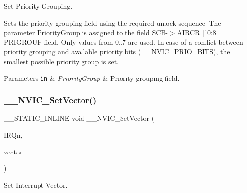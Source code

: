 Set Priority Grouping. 

Sets the priority grouping field using the required unlock sequence. The parameter Priority\+Group is assigned to the field S\+C\+B-\/$>$A\+I\+R\+CR \mbox{[}10\+:8\mbox{]} P\+R\+I\+G\+R\+O\+UP field. Only values from 0..7 are used. In case of a conflict between priority grouping and available priority bits (\+\_\+\+\_\+\+N\+V\+I\+C\+\_\+\+P\+R\+I\+O\+\_\+\+B\+I\+TS), the smallest possible priority group is set. 
\begin{DoxyParams}[1]{Parameters}
\mbox{\tt in}  & {\em Priority\+Group} & Priority grouping field. \\
\hline
\end{DoxyParams}
\mbox{\label{group___c_m_s_i_s___core___n_v_i_c_functions_ga0df355460bc1783d58f9d72ee4884208}} 
\subsubsection{\texorpdfstring{\+\_\+\+\_\+\+N\+V\+I\+C\+\_\+\+Set\+Vector()}{\_\_NVIC\_SetVector()}}
{\footnotesize\ttfamily \+\_\+\+\_\+\+S\+T\+A\+T\+I\+C\+\_\+\+I\+N\+L\+I\+NE void \+\_\+\+\_\+\+N\+V\+I\+C\+\_\+\+Set\+Vector (\begin{DoxyParamCaption}\item[{\hyperlink{group___peripheral__interrupt__number__definition_ga7e1129cd8a196f4284d41db3e82ad5c8}{I\+R\+Qn\+\_\+\+Type}}]{I\+R\+Qn,  }\item[{uint32\+\_\+t}]{vector }\end{DoxyParamCaption})}



Set Interrupt Vector. 

